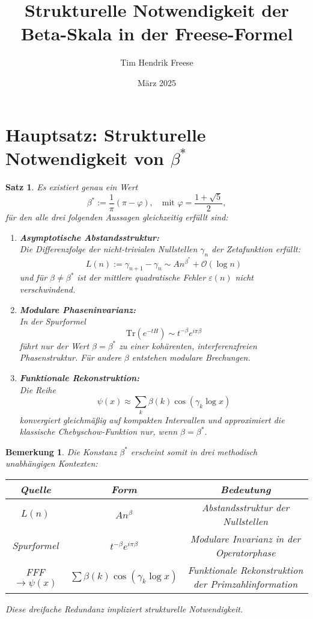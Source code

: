 \documentclass[12pt]{article}
\title{Strukturelle Notwendigkeit der Beta-Skala in der Freese-Formel}
\author{Tim Hendrik Freese}
\date{März 2025}
\newtheorem{theorem}{Satz}
\newtheorem{remark}{Bemerkung}
\begin{document}
\maketitle

\section*{Hauptsatz: Strukturelle Notwendigkeit von \( \beta^* \)}

\begin{theorem}
Es existiert genau ein Wert
\[
\beta^* := \frac{1}{\pi}(\pi - \varphi), \quad \text{mit } \varphi = \frac{1 + \sqrt{5}}{2},
\]
für den alle drei folgenden Aussagen gleichzeitig erfüllt sind:
\begin{enumerate}
    \item \textbf{Asymptotische Abstandsstruktur:}\\
    Die Differenzfolge der nicht-trivialen Nullstellen \( \gamma_n \) der Zetafunktion erfüllt:
    \[
    L(n) := \gamma_{n+1} - \gamma_n \sim A n^{\beta^*} + \mathcal{O}(\log n)
    \]
    und für \( \beta \ne \beta^* \) ist der mittlere quadratische Fehler \( \varepsilon(n) \) nicht verschwindend.
    
    \item \textbf{Modulare Phaseninvarianz:}\\
    In der Spurformel
    \[
    \mathrm{Tr}(e^{-tH}) \sim t^{-\beta} e^{i\pi \beta}
    \]
    führt nur der Wert \( \beta = \beta^* \) zu einer kohärenten, interferenzfreien Phasenstruktur. Für andere \( \beta \) entstehen modulare Brechungen.
    
    \item \textbf{Funktionale Rekonstruktion:}\\
    Die Reihe
    \[
    \psi(x) \approx \sum_k \beta(k) \cos(\gamma_k \log x)
    \]
    konvergiert gleichmäßig auf kompakten Intervallen und approximiert die klassische Chebyschow-Funktion nur, wenn \( \beta = \beta^* \).
\end{enumerate}
\end{theorem}

\begin{remark}
Die Konstanz \( \beta^* \) erscheint somit in drei methodisch unabhängigen Kontexten:
\begin{center}
\begin{tabular}{|c|c|c|}
\hline
\textbf{Quelle} & \textbf{Form} & \textbf{Bedeutung} \\
\hline
\( L(n) \) & \( A n^{\beta} \) & Abstandsstruktur der Nullstellen \\
\hline
Spurformel & \( t^{-\beta} e^{i\pi \beta} \) & Modulare Invarianz in der Operatorphase \\
\hline
FFF \( \to \psi(x) \) & \( \sum \beta(k) \cos(\gamma_k \log x) \) & Funktionale Rekonstruktion der Primzahlinformation \\
\hline
\end{tabular}
\end{center}
Diese dreifache Redundanz impliziert strukturelle Notwendigkeit.
\end{remark}
\end{document}
